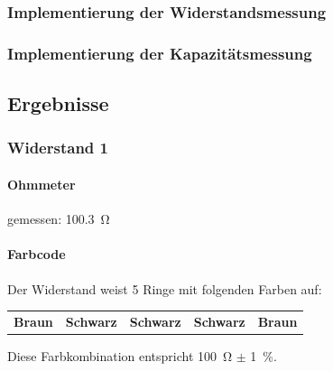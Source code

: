\newpage
\subsubsection{Implementierung der Widerstandsmessung}





\subsubsection{Implementierung der Kapazitätsmessung}



\newpage


\newpage
\subsection{Ergebnisse}

\subsubsection{Widerstand 1}

\paragraph{Ohmmeter} gemessen: \SI{100.3}{\ohm}

\paragraph{Farbcode} Der Widerstand weist 5 Ringe mit folgenden Farben auf:

\begin{tabularx}{\textwidth}{Y|Y|Y|Y|Y}
    \color{white}\textbf{Braun} &
    \color{white}\textbf{Schwarz} &
    \color{white}\textbf{Schwarz} &
    \color{white}\textbf{Schwarz} &
    \color{white}\textbf{Braun}
\end{tabularx}

Diese Farbkombination entspricht \SI{100}{\ohm} $\pm$ \SI{1}{\percent}.


